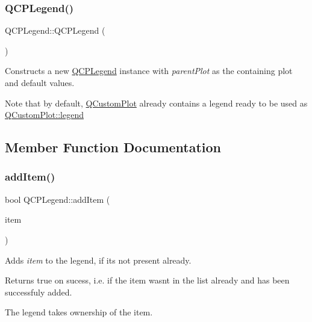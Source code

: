 \subsubsection{\texorpdfstring{Q\+C\+P\+Legend()}{QCPLegend()}}
{\footnotesize\ttfamily Q\+C\+P\+Legend\+::\+Q\+C\+P\+Legend (\begin{DoxyParamCaption}{ }\end{DoxyParamCaption})\hspace{0.3cm}{\ttfamily [explicit]}}

Constructs a new \mbox{\hyperlink{class_q_c_p_legend}{Q\+C\+P\+Legend}} instance with {\itshape parent\+Plot} as the containing plot and default values.

Note that by default, \mbox{\hyperlink{class_q_custom_plot}{Q\+Custom\+Plot}} already contains a legend ready to be used as \mbox{\hyperlink{class_q_custom_plot_a4eadcd237dc6a09938b68b16877fa6af}{Q\+Custom\+Plot\+::legend}} 

\subsection{Member Function Documentation}
\mbox{\label{class_q_c_p_legend_a3ab274de52d2951faea45a6d975e6b3f}} 
\subsubsection{\texorpdfstring{add\+Item()}{addItem()}}
{\footnotesize\ttfamily bool Q\+C\+P\+Legend\+::add\+Item (\begin{DoxyParamCaption}\item[{\mbox{\hyperlink{class_q_c_p_abstract_legend_item}{Q\+C\+P\+Abstract\+Legend\+Item}} $\ast$}]{item }\end{DoxyParamCaption})}

Adds {\itshape item} to the legend, if it\textquotesingle{}s not present already.

Returns true on sucess, i.\+e. if the item wasn\textquotesingle{}t in the list already and has been successfuly added.

The legend takes ownership of the item. \mbox{\label{class_q_c_p_legend_a24795c7250eb5214fcea16b7217b4dfb}} 
